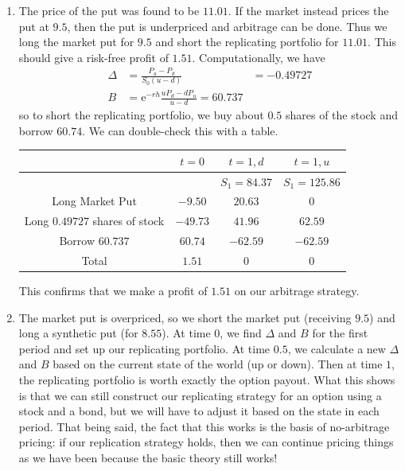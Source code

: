 \documentclass[12pt, letterpaper]{article}
\newcommand{\e}{\mathrm{e}}
\begin{document}
\begin{enumerate}
    \item The price of the put was found to be \(11.01\). If the market instead prices the put at \(9.5\), then the put is underpriced and arbitrage can be done. Thus we long the market put for \(9.5\) and short the replicating portfolio for \(11.01\). This should give a risk-free profit of \(1.51\). Computationally, we have
    \begin{align*}
    \Delta &= \frac{P_u - P_d}{S_0 (u - d)} &= -0.49727 \\
    B &= \e^{-rh} \frac{u P_d - d P_u}{u - d} = 60.737
    \end{align*}
    so to short the replicating portfolio, we buy about \(0.5\) shares of the stock and borrow \(60.74\). We can double-check this with a table.

    \begin{tabular}{|c|c|c|c|}
        \hline
         & \(t = 0\) & \(t = 1, d\) & \(t = 1, u\) \\
         \hline
         & & \(S_1 = 84.37\) & \(S_1 = 125.86\) \\
         \hline
         Long Market Put & \(-9.50\) & \(20.63\) & \(0\) \\
         \hline
         Long \(0.49727\) shares of stock & \(-49.73\) & \(41.96\) & \(62.59\) \\
         \hline
         Borrow \(60.737\) & \(60.74\) & \(-62.59\) & \(-62.59\) \\
         \hline
         Total & \(1.51\) & \(0\) & \(0\) \\
         \hline
    \end{tabular}
    
    This confirms that we make a profit of \(1.51\) on our arbitrage strategy.
    \item The market put is overpriced, so we short the market put (receiving \(9.5\)) and long a synthetic put (for \(8.55\)). At time 0, we find \(\Delta\) and \(B\) for the first period and set up our replicating portfolio. At time \(0.5\), we calculate a new \(\Delta\) and \(B\) based on the current state of the world (up or down). Then at time \(1\), the replicating portfolio is worth exactly the option payout. What this shows is that we can still construct our replicating strategy for an option using a stock and a bond, but we will have to adjust it based on the state in each period. That being said, the fact that this works is the basis of no-arbitrage pricing: if our replication strategy holds, then we can continue pricing things as we have been because the basic theory still works!

    \end{enumerate}
\end{document}
